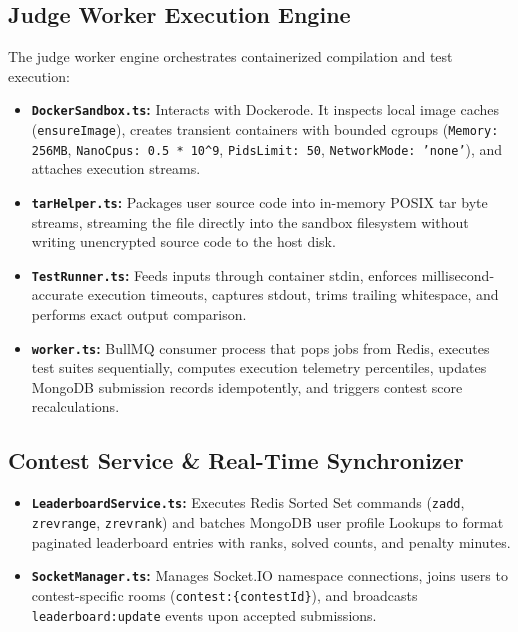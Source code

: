 \documentclass[12pt,a4paper]{report}
\begin{document}
\subsection{Judge Worker Execution Engine}
The judge worker engine orchestrates containerized compilation and test execution:
\begin{itemize}[leftmargin=*]
  \item \textbf{\texttt{DockerSandbox.ts}:} Interacts with Dockerode. It inspects local image caches (\texttt{ensureImage}), creates transient containers with bounded cgroups (\texttt{Memory: 256MB}, \texttt{NanoCpus: 0.5 * 10\^{}9}, \texttt{PidsLimit: 50}, \texttt{NetworkMode: 'none'}), and attaches execution streams.
  \item \textbf{\texttt{tarHelper.ts}:} Packages user source code into in-memory POSIX tar byte streams, streaming the file directly into the sandbox filesystem without writing unencrypted source code to the host disk.
  \item \textbf{\texttt{TestRunner.ts}:} Feeds inputs through container stdin, enforces millisecond-accurate execution timeouts, captures stdout, trims trailing whitespace, and performs exact output comparison.
  \item \textbf{\texttt{worker.ts}:} BullMQ consumer process that pops jobs from Redis, executes test suites sequentially, computes execution telemetry percentiles, updates MongoDB submission records idempotently, and triggers contest score recalculations.
\end{itemize}

\subsection{Contest Service \& Real-Time Synchronizer}
\begin{itemize}[leftmargin=*]
  \item \textbf{\texttt{LeaderboardService.ts}:} Executes Redis Sorted Set commands (\texttt{zadd}, \texttt{zrevrange}, \texttt{zrevrank}) and batches MongoDB user profile Lookups to format paginated leaderboard entries with ranks, solved counts, and penalty minutes.
  \item \textbf{\texttt{SocketManager.ts}:} Manages Socket.IO namespace connections, joins users to contest-specific rooms (\texttt{contest:\{contestId\}}), and broadcasts \texttt{leaderboard:update} events upon accepted submissions.
\end{itemize}
\end{document}
